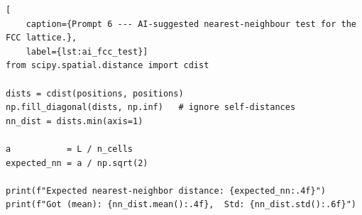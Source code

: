 \begin{lstlisting}[
    caption={Prompt 6 --- AI-suggested nearest-neighbour test for the FCC lattice.},
    label={lst:ai_fcc_test}]
from scipy.spatial.distance import cdist
 
dists = cdist(positions, positions)
np.fill_diagonal(dists, np.inf)   # ignore self-distances
nn_dist = dists.min(axis=1)
 
a           = L / n_cells
expected_nn = a / np.sqrt(2)
 
print(f"Expected nearest-neighbor distance: {expected_nn:.4f}")
print(f"Got (mean): {nn_dist.mean():.4f},  Std: {nn_dist.std():.6f}")
\end{lstlisting}
 
